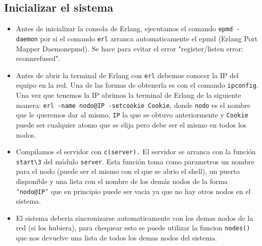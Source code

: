 \documentclass[a4paper]{article}
\newcommand{\blacktr}[0]{\item[$\blacktriangleright$]}
\begin{document}
\subsection*{Inicializar el sistema}
\begin{itemize}
    \blacktr Antes de inicializar la consola de Erlang, ejecutamos el comando \texttt{\textdollar epmd -daemon} por si el comando \texttt{\textdollar erl} arranca automaticamente el epmd (Erlang  Port  Mapper  Daemonepmd). Se hace para evitar el error "register/listen error: econnrefused".
    
    \blacktr Antes de abrir la terminal de Erlang con \texttt{\textdollar erl} debemos conocer la IP del equipo en la red. Una de las formas de obtenerla es con el comando \texttt{\textdollar ipconfig}. Una vez que tenemos la IP abrimos la terminal de Erlang de la siguiente manera: \texttt{erl -name nodo@IP -setcookie Cookie}, donde \texttt{nodo} es el nombre que le queremos dar al mismo, \texttt{IP} la que se obtuvo anteriormente y \texttt{Cookie} puede ser cualquier atomo que se elija pero debe ser el mismo en todos los nodos.
    
    \blacktr Compilamos el servidor con \texttt{c(server).} El servidor se arranca con la función \texttt{start\textbackslash3} del módulo \texttt{server}. Esta función toma como parametros un nombre para el nodo (puede ser el mismo con el que se abrio el shell), un puerto disponible y una lista con el nombre de los demás nodos de la forma \texttt{'nodo@IP'} que en principio puede ser vacia ya que no hay otros nodos en el sistema. 

    \blacktr El sistema deberia sincronizarse automaticamente con los demas nodos de la red (si los hubiera), para chequear esto se puede utilizar la funcion \texttt{nodes()} que nos devuelve una lista de todos los demas nodos del sistema.

\end{itemize}
\end{document}
